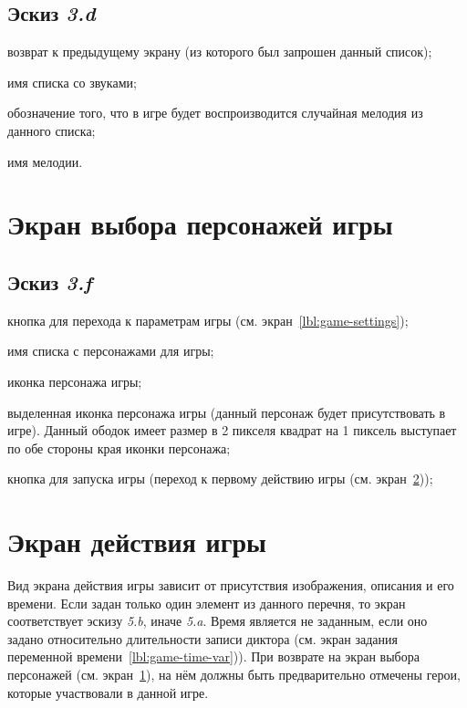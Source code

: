 \subsection{Эскиз \emph{3.d}}

\begin{enumerate*}
    \item возврат к предыдущему экрану (из которого был запрошен данный список);
    \item имя списка со звуками;
    \item обозначение того, что в игре будет воспроизводится случайная мелодия из данного списка;
    \item имя мелодии.
\end{enumerate*}

\section{Экран выбора персонажей игры}\label{lbl:game-characters}

\subsection{Эскиз \emph{3.f}}

\begin{enumerate*}
    \item кнопка для перехода к параметрам игры (см. экран~\ref{lbl:game-settings});
    \item имя списка с персонажами для игры;
    \item иконка персонажа игры;
    \item выделенная иконка персонажа игры (данный персонаж будет присутствовать в игре). Данный ободок имеет размер в 2 пикселя квадрат на 1 пиксель выступает по обе стороны края иконки персонажа;
    \item кнопка для запуска игры (переход к первому действию игры (см. экран~\ref{lbl:game-action}));
\end{enumerate*}

\section{Экран действия игры}\label{lbl:game-action}

Вид экрана действия игры зависит от присутствия изображения, описания и его времени. Если задан только один элемент из данного перечня, то экран соответствует эскизу \emph{5.b}, иначе \emph{5.a}. Время является не заданным, если оно задано относительно длительности записи диктора (см. экран задания переменной времени~\ref{lbl:game-time-var})). При возврате на экран выбора персонажей (см. экран~\ref{lbl:game-characters}), на нём должны быть предварительно отмечены герои, которые участвовали в данной игре.

